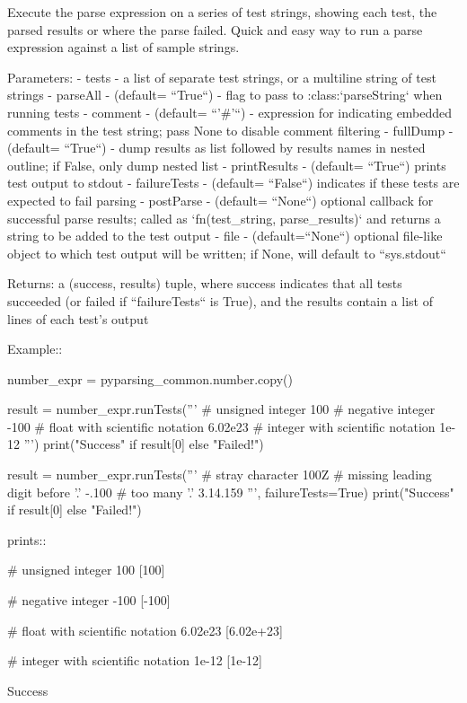 \begin{DoxyVerb}Execute the parse expression on a series of test strings, showing each
test, the parsed results or where the parse failed. Quick and easy way to
run a parse expression against a list of sample strings.

Parameters:
 - tests - a list of separate test strings, or a multiline string of test strings
 - parseAll - (default= ``True``) - flag to pass to :class:`parseString` when running tests
 - comment - (default= ``'#'``) - expression for indicating embedded comments in the test
      string; pass None to disable comment filtering
 - fullDump - (default= ``True``) - dump results as list followed by results names in nested outline;
      if False, only dump nested list
 - printResults - (default= ``True``) prints test output to stdout
 - failureTests - (default= ``False``) indicates if these tests are expected to fail parsing
 - postParse - (default= ``None``) optional callback for successful parse results; called as
      `fn(test_string, parse_results)` and returns a string to be added to the test output
 - file - (default=``None``) optional file-like object to which test output will be written;
      if None, will default to ``sys.stdout``

Returns: a (success, results) tuple, where success indicates that all tests succeeded
(or failed if ``failureTests`` is True), and the results contain a list of lines of each
test's output

Example::

    number_expr = pyparsing_common.number.copy()

    result = number_expr.runTests('''
# unsigned integer
100
# negative integer
-100
# float with scientific notation
6.02e23
# integer with scientific notation
1e-12
''')
    print("Success" if result[0] else "Failed!")

    result = number_expr.runTests('''
# stray character
100Z
# missing leading digit before '.'
-.100
# too many '.'
3.14.159
''', failureTests=True)
    print("Success" if result[0] else "Failed!")

prints::

    # unsigned integer
    100
    [100]

    # negative integer
    -100
    [-100]

    # float with scientific notation
    6.02e23
    [6.02e+23]

    # integer with scientific notation
    1e-12
    [1e-12]

    Success


\end{DoxyVerb}
